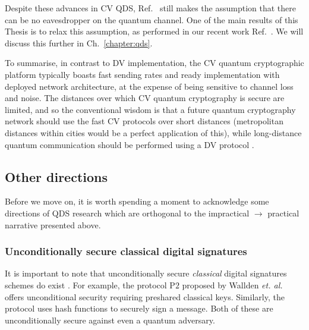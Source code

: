 Despite these advances in CV QDS, Ref.~\cite{Croal2016} still makes the assumption that there can be no eavesdropper on the quantum channel. One of the main results of this Thesis is to relax this assumption, as performed in our recent work Ref.~\cite{Thornton2019}. We will discuss this further in Ch.~\ref{chapter:qds}.

To summarise, in contrast to DV implementation, the CV quantum cryptographic platform typically boasts fast sending rates and ready implementation with deployed network architecture, at the expense of being sensitive to channel loss and noise. The distances over which CV quantum cryptography is secure are limited, and so the conventional wisdom is that a future quantum cryptography network should use the fast CV protocols over short distances (metropolitan distances within cities would be a perfect application of this), while long-distance quantum communication should be performed using a DV protocol \cite{Pirandola2015a}. %



\subsection{Other directions}


%
%

Before we move on, it is worth spending a moment to acknowledge some directions of QDS research which are orthogonal to the impractical $\rightarrow$ practical narrative presented above.


\subsubsection*{Unconditionally secure classical digital signatures}
It is important to note that unconditionally secure \emph{classical} digital signatures schemes do exist \cite{Wallden2015, Amiri2016a, Hanaoka2000}. For example, the protocol P$2$ proposed by Wallden \emph{et. al.} \cite{Wallden2015} offers unconditional security requiring preshared classical keys. Similarly, the protocol \cite{Amiri2016a} uses hash functions to securely sign a message. %
Both of these are unconditionally secure against even a quantum adversary.

